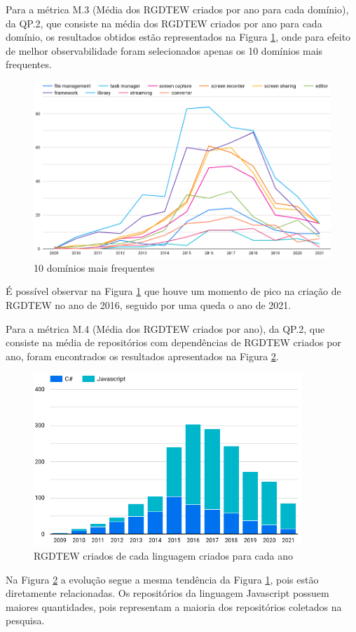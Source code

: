 \documentclass[12pt]{article}
\begin{document}
Para a métrica M.3 (Média dos RGDTEW criados por ano para cada domínio), da QP.2, que consiste na média dos RGDTEW criados por ano para cada domínio, os resultados obtidos estão representados na Figura \ref{fig:10 domínios mais frequentes}, onde para efeito de melhor observabilidade foram selecionados apenas os 10 domínios mais frequentes.
\begin{figure}[ht]
    \centering
    \includegraphics[width=1\textwidth]{images/10 dom mais fre.png}
    \caption{10 domínios mais frequentes}
    \label{fig:10 domínios mais frequentes}
\end{figure}
É possível observar na Figura \ref{fig:10 domínios mais frequentes} que houve um momento de pico na criação de RGDTEW no ano de 2016, seguido por uma queda o ano de 2021. 

Para a métrica M.4 (Média dos RGDTEW criados por ano), da QP.2, que consiste na média de repositórios com dependências de RGDTEW criados por ano, foram encontrados os resultados apresentados na Figura \ref{fig:RGDTEW criados de cada linguagem criados por ano}.
\begin{figure}[ht]
    \centering
    \includegraphics[width=0.9\textwidth]{images/lang por ano.png}
    \caption{RGDTEW criados de cada linguagem criados para cada ano}
    \label{fig:RGDTEW criados de cada linguagem criados por ano}
\end{figure}
Na Figura \ref{fig:RGDTEW criados de cada linguagem criados por ano} a evolução segue a mesma tendência da Figura \ref{fig:10 domínios mais frequentes}, pois estão diretamente relacionadas. Os repositórios da linguagem Javascript possuem maiores quantidades, pois representam a maioria dos repositórios coletados na pesquisa.
\end{document}
